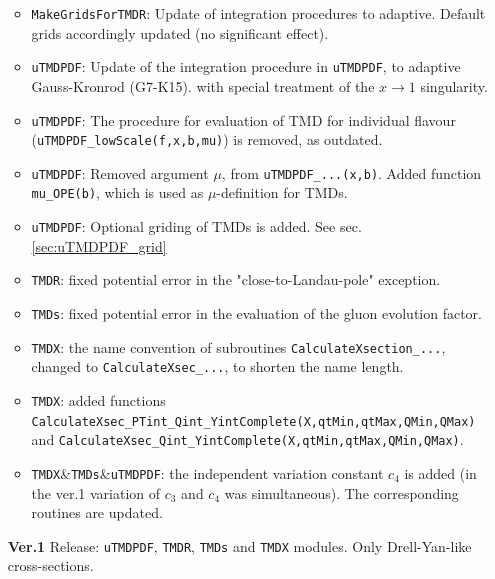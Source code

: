 \documentclass[prd,nofootinbib,eqsecnum,final]{revtex4}
\renewcommand{\(}{\left(}
\renewcommand{\)}{\right)}
\renewcommand{\[}{\left[}
\renewcommand{\]}{\right]}
\begin{document}
\begin{itemize}
\begin{itemize}
\item \texttt{MakeGridsForTMDR}: Update of integration procedures to adaptive. Default grids accordingly updated (no significant effect).
\item \texttt{uTMDPDF}: Update of the integration procedure in \texttt{uTMDPDF}, to adaptive Gauss-Kronrod (G7-K15). with special treatment of the $x\to 1$ singularity.
\item \texttt{uTMDPDF}: The procedure for evaluation of TMD for individual flavour (\texttt{uTMDPDF{\_}lowScale(f,x,b,mu)}) is removed, as outdated.
\item \texttt{uTMDPDF}: Removed argument $\mu$, from \texttt{uTMDPDF{\_}...(x,b)}. Added function \texttt{mu{\_}OPE(b)}, which is used as $\mu$-definition for TMDs.
\item \texttt{uTMDPDF}: Optional griding of TMDs is added. See sec.\ref{sec:uTMDPDF_grid}
\item \texttt{TMDR}: fixed potential error in the "close-to-Landau-pole" exception.
\item \texttt{TMDs}: fixed potential error in the evaluation of the gluon evolution factor.
\item \texttt{TMDX}: the name convention of subroutines \texttt{CalculateXsection{\_}...}, changed to \texttt{CalculateXsec{\_}...}, to shorten the name length.
\item \texttt{TMDX}: added functions \texttt{CalculateXsec{\_}PTint{\_}Qint{\_}YintComplete(X,qtMin,qtMax,QMin,QMax)} and \texttt{CalculateXsec{\_}Qint{\_}YintComplete(X,qtMin,qtMax,QMin,QMax)}.
\item \texttt{TMDX}\&\texttt{TMDs}\&\texttt{uTMDPDF}: the independent variation constant $c_4$ is added (in the ver.1 variation of $c_3$ and $c_4$ was simultaneous). The corresponding routines are updated.
\end{itemize}
\item[\textbf{Ver.1}] Release: \texttt{uTMDPDF}, \texttt{TMDR}, \texttt{TMDs} and \texttt{TMDX} modules. Only Drell-Yan-like cross-sections.
\end{itemize}



\clearpage
\end{document}
